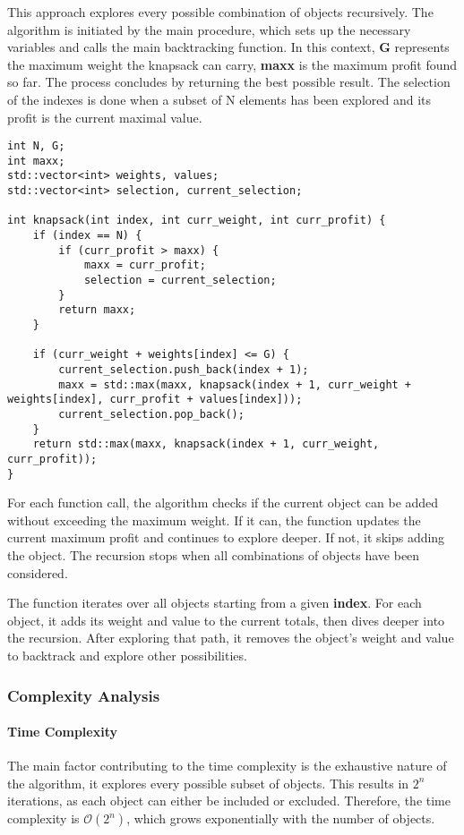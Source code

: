 \documentclass[runningheads]{llncs}
\begin{document}
This approach explores every possible combination of objects recursively. The algorithm is initiated
by the main procedure, which sets up the necessary variables and calls the main backtracking
function. In this context, \textbf{G} represents the maximum weight the knapsack can carry, 
\textbf{maxx} is the maximum profit found so far. The process concludes by returning the best 
possible result. The selection of the indexes is done when a subset of N elements has been explored
and its profit is the current maximal value.


\begin{lstlisting}
int N, G;
int maxx;
std::vector<int> weights, values;
std::vector<int> selection, current_selection;

int knapsack(int index, int curr_weight, int curr_profit) {
	if (index == N) {
		if (curr_profit > maxx) {
			maxx = curr_profit;
			selection = current_selection;
		}
		return maxx;
	}

	if (curr_weight + weights[index] <= G) {
		current_selection.push_back(index + 1);
		maxx = std::max(maxx, knapsack(index + 1, curr_weight + weights[index], curr_profit + values[index]));
		current_selection.pop_back();
	}
	return std::max(maxx, knapsack(index + 1, curr_weight, curr_profit));
}
\end{lstlisting}

For each function call, the algorithm checks if the current object can be added without exceeding 
the maximum weight. If it can, the function updates the current maximum profit and continues to 
explore deeper. If not, it skips adding the object. The recursion stops when all combinations of objects have been considered.

The function iterates over all objects starting from a given \textbf{index}. For each object, it 
adds its weight and value to the current totals, then dives deeper into the recursion. After 
exploring that path, it removes the object’s weight and value to backtrack and explore other 
possibilities.

\subsubsection{Complexity Analysis}
\paragraph{Time Complexity}
The main factor contributing to the time complexity is the exhaustive nature of the algorithm, it 
explores every possible subset of objects. This results in \( 2^n \) iterations, as each object can 
either be included or excluded. Therefore, the time complexity is $\mathcal{O}(2^n)$, which grows exponentially with the number of objects.
\end{document}
